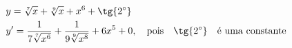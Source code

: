 \begin{ex}
\begin{align}
&y=\sqrt[7]{x}+\sqrt[9]{x}+x^6+\tg{2^\circ}\nonumber\\
&y'=\frac{1}{7\sqrt[7]{x^6}}+\frac{1}{9\sqrt[9]{x^8}}+6x^5+0,\quad\text{pois}\quad\tg{2^\circ}\quad\text{é uma constante}\nonumber
\end{align}
\end{ex}
